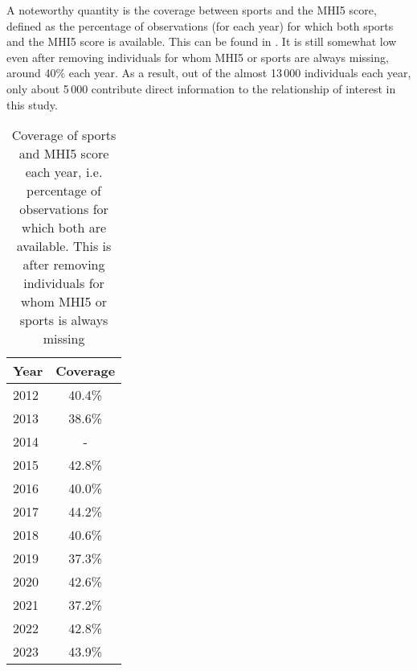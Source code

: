 A noteworthy quantity is the coverage between sports and the MHI5 score, defined as the percentage of observations
(for each year) for which both sports and the MHI5 score is available.
This can be found in . It is still somewhat low even after removing individuals for whom MHI5
or sports are always missing, around 40\% each year.
As a result, out of the almost 13\,000 individuals each year, only about 5\,000 contribute direct information
to the relationship of interest in this study.

\begin{table}[htbp]
    \centering
    \caption{Coverage of sports and MHI5 score each year, i.e. percentage of observations for which both are available.
    This is after removing individuals for whom MHI5 or sports is always missing}
    \label{tab:data:coverage}
    \begin{tabular}{lc}
        \toprule
        Year & Coverage \\
        \hline
        2012 & 40.4\% \\
        2013 & 38.6\% \\
        2014 & -      \\
        2015 & 42.8\% \\
        2016 & 40.0\% \\
        2017 & 44.2\% \\
        2018 & 40.6\% \\
        2019 & 37.3\% \\
        2020 & 42.6\% \\
        2021 & 37.2\% \\
        2022 & 42.8\% \\
        2023 & 43.9\% \\
        \bottomrule
    \end{tabular}
\end{table}

